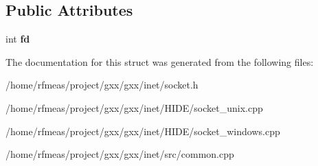 \subsection*{Public Attributes}
\begin{DoxyCompactItemize}
\item 
int {\bfseries fd}\hypertarget{structgxx_1_1inet_1_1socket_a0919e47c46750635642cd8b7d6106667}{}\label{structgxx_1_1inet_1_1socket_a0919e47c46750635642cd8b7d6106667}

\end{DoxyCompactItemize}


The documentation for this struct was generated from the following files\+:\begin{DoxyCompactItemize}
\item 
/home/rfmeas/project/gxx/gxx/inet/socket.\+h\item 
/home/rfmeas/project/gxx/gxx/inet/\+H\+I\+D\+E/socket\+\_\+unix.\+cpp\item 
/home/rfmeas/project/gxx/gxx/inet/\+H\+I\+D\+E/socket\+\_\+windows.\+cpp\item 
/home/rfmeas/project/gxx/gxx/inet/src/common.\+cpp\end{DoxyCompactItemize}
